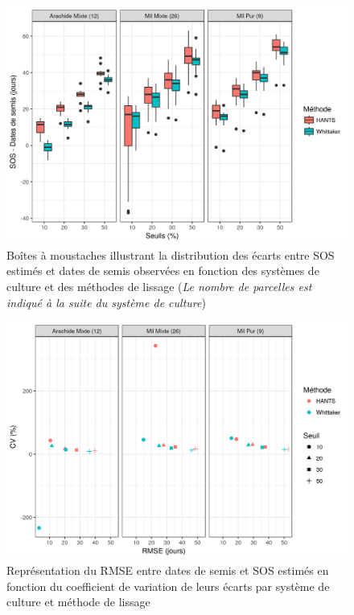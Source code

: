 \begin{figure}[htbp]
 \begin{center}
  \includegraphics[scale=0.7]{resultats_discussions/SOS_Boxplot.png} 
 \end{center}
 \caption[Distribution des écarts entre SOS et dates de semis]{Boîtes à moustaches illustrant la distribution des écarts entre SOS estimés et dates de semis observées en fonction des systèmes de culture et des méthodes de lissage (\emph{Le nombre de parcelles est indiqué à la suite du système de culture})}
 \label{fig-sosboxplot}
\end{figure}

\begin{figure}[htbp]
 \begin{center}
  \includegraphics[scale=0.7]{resultats_discussions/SOS_RMSE_vs_CV.png} 
 \end{center}
 \caption[SOS -- RMSE vs CV]{Représentation du RMSE entre dates de semis et SOS estimés en fonction du coefficient de variation de leurs écarts par système de culture et méthode de lissage}
 \label{fig-sos-rmse-cv}
\end{figure}

